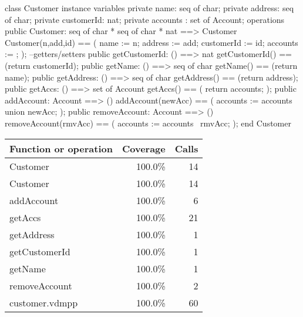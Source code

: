\documentclass[a4paper]{article}
\begin{document}
\title{}
\author{}
\begin{vdm_al}

class Customer
instance variables
    private name: seq of char;
    private address: seq of char;
    private customerId: nat;
    private accounts : set of Account;
operations
    public Customer: seq of char * seq of char * nat ==> Customer
    Customer(n,add,id) == (
        name := n;
        address := add;
        customerId := id;
        accounts := {};
    );
    --getters/setters
    public getCustomerId: () ==> nat
    getCustomerId() == (return customerId);
    public getName: () ==> seq of char
    getName() == (return name);
    public getAddress: () ==> seq of char
    getAddress() == (return address);
    public getAccs: () ==> set of Account
    getAccs() == (
        return accounts;
    );
    public addAccount: Account ==> ()
    addAccount(newAcc) == (
        accounts := accounts union {newAcc};
    );
    public removeAccount: Account ==> ()
    removeAccount(rmvAcc) == (
        accounts := accounts \ {rmvAcc};
    );
end Customer
\end{vdm_al}
\bigskip
\begin{longtable}{|l|r|r|}
\hline
Function or operation & Coverage & Calls \\
\hline
\hline
Customer & 100.0\% & 14 \\
\hline
Customer & 100.0\% & 14 \\
\hline
addAccount & 100.0\% & 6 \\
\hline
getAccs & 100.0\% & 21 \\
\hline
getAddress & 100.0\% & 1 \\
\hline
getCustomerId & 100.0\% & 1 \\
\hline
getName & 100.0\% & 1 \\
\hline
removeAccount & 100.0\% & 2 \\
\hline
\hline
customer.vdmpp & 100.0\% & 60 \\
\hline
\end{longtable}
\end{document}
